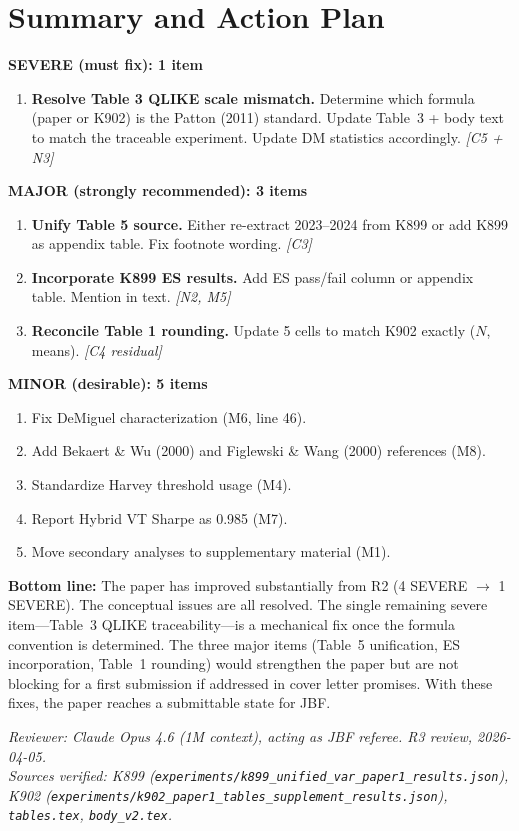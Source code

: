 \documentclass[12pt,a4paper]{article}
\begin{document}
\bigskip

\section*{Summary and Action Plan}

\textbf{SEVERE (must fix): 1 item}
\begin{enumerate}
\item \textbf{Resolve Table 3 QLIKE scale mismatch.} Determine which formula (paper or K902) is the Patton (2011) standard. Update Table~3 + body text to match the traceable experiment. Update DM statistics accordingly. \textit{[C5 + N3]}
\end{enumerate}

\textbf{MAJOR (strongly recommended): 3 items}
\begin{enumerate}[resume]
\item \textbf{Unify Table 5 source.} Either re-extract 2023--2024 from K899 or add K899 as appendix table. Fix footnote wording. \textit{[C3]}
\item \textbf{Incorporate K899 ES results.} Add ES pass/fail column or appendix table. Mention in text. \textit{[N2, M5]}
\item \textbf{Reconcile Table 1 rounding.} Update 5 cells to match K902 exactly ($N$, means). \textit{[C4 residual]}
\end{enumerate}

\textbf{MINOR (desirable): 5 items}
\begin{enumerate}[resume]
\item Fix DeMiguel characterization (M6, line 46).
\item Add Bekaert \& Wu (2000) and Figlewski \& Wang (2000) references (M8).
\item Standardize Harvey threshold usage (M4).
\item Report Hybrid VT Sharpe as 0.985 (M7).
\item Move secondary analyses to supplementary material (M1).
\end{enumerate}

\bigskip

\noindent\textbf{Bottom line:} The paper has improved substantially from R2 (4 SEVERE $\to$ 1 SEVERE). The conceptual issues are all resolved. The single remaining severe item---Table~3 QLIKE traceability---is a mechanical fix once the formula convention is determined. The three major items (Table~5 unification, ES incorporation, Table~1 rounding) would strengthen the paper but are not blocking for a first submission if addressed in cover letter promises. With these fixes, the paper reaches a submittable state for JBF.

\bigskip

\noindent\textit{Reviewer: Claude Opus 4.6 (1M context), acting as JBF referee. R3 review, 2026-04-05.}\\
\noindent\textit{Sources verified: K899 (\texttt{experiments/k899\_unified\_var\_paper1\_results.json}), K902 (\texttt{experiments/k902\_paper1\_tables\_supplement\_results.json}), \texttt{tables.tex}, \texttt{body\_v2.tex}.}
\end{document}
